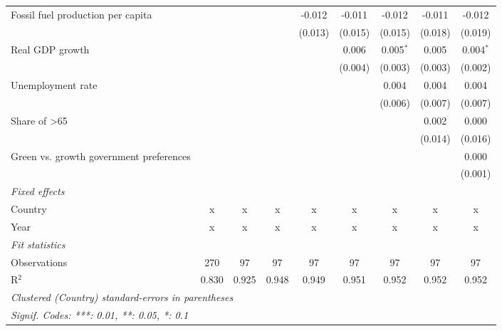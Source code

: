 \begin{table}[htbp]
\begin{tabular}{lcccccccc}
      Fossil fuel production per capita       &         &         &               & -0.012        & -0.011        & -0.012        & -0.011        & -0.012\\   
                                              &         &         &               & (0.013)       & (0.015)       & (0.015)       & (0.018)       & (0.019)\\   
      Real GDP growth                         &         &         &               &               & 0.006         & 0.005$^{*}$   & 0.005         & 0.004$^{*}$\\   
                                              &         &         &               &               & (0.004)       & (0.003)       & (0.003)       & (0.002)\\   
      Unemployment rate                       &         &         &               &               &               & 0.004         & 0.004         & 0.004\\   
                                              &         &         &               &               &               & (0.006)       & (0.007)       & (0.007)\\   
      Share of >65                            &         &         &               &               &               &               & 0.002         & 0.000\\   
                                              &         &         &               &               &               &               & (0.014)       & (0.016)\\   
      Green vs. growth government preferences &         &         &               &               &               &               &               & 0.000\\   
                                              &         &         &               &               &               &               &               & (0.001)\\   
      \emph{Fixed effects}\\
      Country                                 & x       & x       & x             & x             & x             & x             & x             & x\\  
      Year                                    & x       & x       & x             & x             & x             & x             & x             & x\\  
      \midrule \emph{Fit statistics}\\
      Observations                            & 270     & 97      & 97            & 97            & 97            & 97            & 97            & 97\\  
      R$^2$                                   & 0.830   & 0.925   & 0.948         & 0.949         & 0.951         & 0.952         & 0.952         & 0.952\\  
      \midrule
      \multicolumn{9}{l}{\emph{Clustered (Country) standard-errors in parentheses}}\\
      \multicolumn{9}{l}{\emph{Signif. Codes: ***: 0.01, **: 0.05, *: 0.1}}\\
   \end{tabular}
\end{table}


